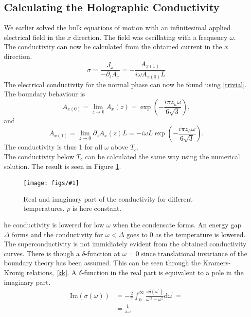 \documentclass[12pt]{report}
\renewcommand{\d}{\ensuremath{\mathrm{d}}}
\renewcommand{\i}{\ensuremath{i}}
\newcommand{\im}{\ensuremath{\mathrm{Im}}}
\newcommand{\fig}[3]{
\begin{figure}
\centering
\texttt{[image: figs/\#1]}
\caption{#2}
\end{figure}
}
\begin{document}
\subsection{Calculating the Holographic Conductivity}
We earlier solved the bulk equations of motion with an infinitesimal applied electrical field in the $x$ direction. The field was oscillating with a frequency $\omega$. The conductivity can now be calculated from the obtained current in the $x$ direction.
\begin{equation}
 \sigma=\frac{J_x}{-\partial_tA_x}=-\frac{A_{x(1)}}{\i\omega A_{x(0)}L}
\end{equation}
The electrical conductivity for the normal phase can now be found using \eqref{trivial}. The boundary behaviour is
\begin{equation}
    A_{x(0)}=\lim_{z\rightarrow0} A_x(z) =  \exp\left(-\frac{\i\pi z_h\omega}{6\sqrt{3}}\right),                                                                                 
\end{equation}
and
\begin{equation}
    A_{x(1)}=\lim_{z\rightarrow0} \partial_zA_x(z)L   = -\i\omega L\exp\left(-\frac{\i\pi z_h\omega}{6\sqrt{3}}\right).      
\end{equation}
The conductivity is thus 1 for all $\omega$ above $T_c$.\\

The conductivity below $T_c$ can be calculated the same way using the numerical solution. The result is seen in Figure \ref{f:cond}.\\

\fig{cond_Ts_a2_0.0_v2.pdf}{Real and imaginary part of the conductivity for different temperatures. $\rho$ is here constant.\label{f:cond}}

The conductivity is lowered for low $\omega$ when the condensate forms. An energy gap $\Delta$ forms and the conductivity for $\omega<\Delta$ goes to 0 as the temperature is lowered. The superconductivity is not immidiately evident from the obtained conductivity curves. There is though a $\delta$-function at $\omega=0$ since translational invariance of the boundary theory has been assumed. This can be seen through the Kramers-Kronig relations, \eqref{kk}. A $\delta$-function in the real part is equivalent to a pole in the imaginary part.
\begin{equation}
\begin{split}
\im(\sigma(\omega))&=-\frac{2}{\pi}\int_0^\infty\frac{\omega\delta(\omega^\prime)}{\omega^{\prime 2}-\omega^2}\d \omega^\prime=\\
&=\frac{1}{\pi\omega}
\end{split}
\end{equation}
\end{document}
